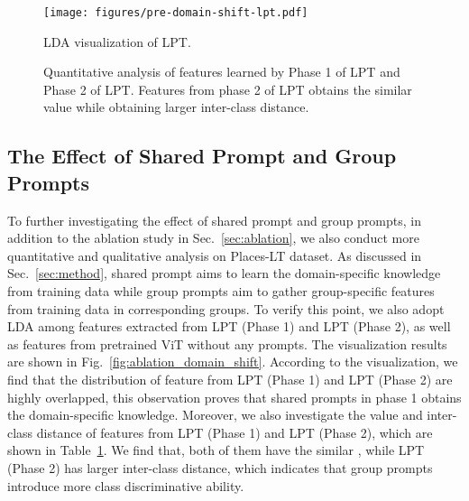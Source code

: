 \documentclass{article} \usepackage{iclr2023_conference,times}
\begin{document}
\begin{figure}[tp]
   \centering
   \begin{minipage}{0.46\textwidth}
\centering
            
      \texttt{[image: figures/pre-domain-shift-lpt.pdf]}
      \vspace{-2em}
      \caption{LDA visualization of LPT.\vspace{-0.6em} } 
      \label{fig:ablation_domain_shift}
   \end{minipage}
\hspace{-1mm}
   \begin{minipage}{0.52\textwidth}
      \renewcommand\arraystretch{1.3}
\centering
      \captionsetup{type=table}
      \caption{Quantitative analysis of features learned by Phase 1 of LPT and Phase 2 of LPT. Features from phase 2 of LPT obtains the similar  value while obtaining larger inter-class distance. }
\setlength{\tabcolsep}{4.6pt} \renewcommand{\arraystretch}{4.5}{ \fontsize{8.3}{3}}
      \label{table:ablation_discriminative}
   \end{minipage}
\end{figure}

\subsection{The Effect of Shared Prompt and Group Prompts}\label{sec:ablation_different_prompts_more}
To further investigating the effect of shared prompt and group prompts, in addition to the ablation study in Sec.~\ref{sec:ablation}, we also conduct more quantitative and qualitative analysis on Places-LT dataset. As discussed in Sec.~\ref{sec:method}, shared prompt aims to learn the domain-specific knowledge from training data while group prompts aim to gather group-specific features from training data in corresponding groups. To verify this point, we also adopt LDA among features extracted from LPT (Phase 1) and LPT (Phase 2), as well as features from pretrained ViT without any prompts. The visualization results are shown in Fig.~\ref{fig:ablation_domain_shift}. According to the visualization, we find that the distribution of feature from LPT (Phase 1) and LPT (Phase 2) are highly overlapped, this observation proves that shared prompts in phase 1 obtains the domain-specific knowledge. Moreover, we also investigate the  value and inter-class distance of features from LPT (Phase 1) and LPT (Phase 2), which are shown in Table~\ref{table:ablation_discriminative}. We find that, both of them have the similar , while LPT (Phase 2) has larger inter-class distance, which indicates that group prompts introduce more class discriminative ability.
\end{document}
